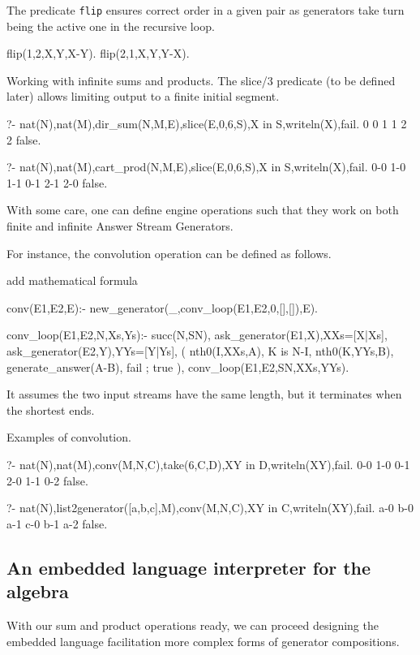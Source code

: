 \documentclass{new_tlp}
\begin{document}
The predicate {\tt flip} ensures correct order in a given pair
as  generators take turn being the active one in the recursive loop. 
\begin{code} 
flip(1,2,X,Y,X-Y).
flip(2,1,X,Y,Y-X).
\end{code}

\BX
Working with infinite sums and products. The slice/3 predicate (to be defined later) allows limiting output to a finite initial segment.
\begin{codex}
?- nat(N),nat(M),dir_sum(N,M,E),slice(E,0,6,S),X in S,writeln(X),fail.
0
0
1
1
2
2
false.

?- nat(N),nat(M),cart_prod(N,M,E),slice(E,0,6,S),X in S,writeln(X),fail.
0-0
1-0
1-1
0-1
2-1
2-0
false.
\end{codex}
\EX


With some care, one can define engine operations such that they work on both
finite and infinite Answer Stream Generators.

For instance, the convolution operation can be defined as follows.


{\Large add mathematical formula}

\begin{code}

conv(E1,E2,E):-
  new_generator(_,conv_loop(E1,E2,0,[],[]),E).

conv_loop(E1,E2,N,Xs,Ys):-
  succ(N,SN),
  ask_generator(E1,X),XXs=[X|Xs],
  ask_generator(E2,Y),YYs=[Y|Ys],
  ( nth0(I,XXs,A),
    K is N-I,
    nth0(K,YYs,B),
    generate_answer(A-B),
    fail
  ; true  
  ),
  conv_loop(E1,E2,SN,XXs,YYs).
\end{code}

It assumes the two input streams have the same length, but it terminates
when the shortest ends. 

\BX
Examples of convolution.
\begin{codex}
?- nat(N),nat(M),conv(M,N,C),take(6,C,D),XY in D,writeln(XY),fail.
0-0
1-0
0-1
2-0
1-1
0-2
false.

?- nat(N),list2generator([a,b,c],M),conv(M,N,C),XY in C,writeln(XY),fail.
a-0
b-0
a-1
c-0
b-1
a-2
false.
\end{codex}
\EX

\subsection{An embedded language interpreter for the algebra}

With our sum and product operations ready, we can proceed designing the embedded language
facilitation more complex forms of generator compositions.
\end{document}
